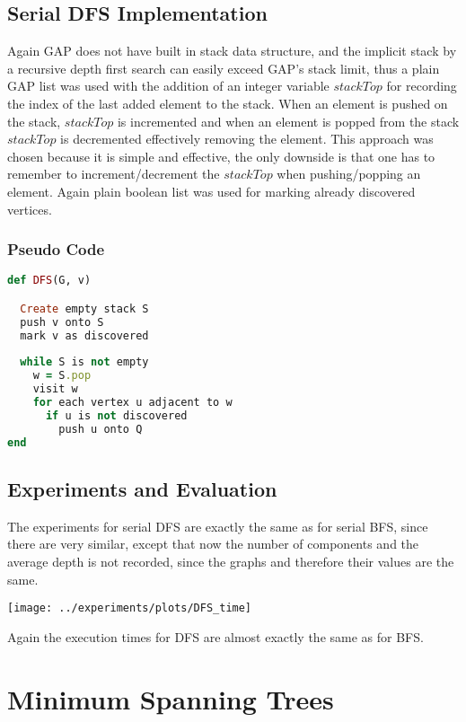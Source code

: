 \documentclass{report}
\theoremstyle{plain}
\theoremstyle{definition}
\theoremstyle{remark}
\begin{document}
\section{Serial DFS Implementation}

Again GAP does not have built in stack data structure, and the implicit stack by a recursive depth first search can easily exceed GAP's stack limit, thus a plain GAP list was used with the addition of an integer variable $stackTop$ for recording the index of the last added element to the stack. When an element is pushed on the stack, $stackTop$ is incremented and when an element is popped from the stack $stackTop$ is decremented effectively removing the element. This approach was chosen because it is simple and effective, the only downside is that one has to remember to increment/decrement the $stackTop$ when pushing/popping an element. Again plain boolean list was used for marking already discovered vertices.

\subsection*{Pseudo Code}

\begin{lstlisting}[language=Ruby]
def DFS(G, v)

  Create empty stack S
  push v onto S
  mark v as discovered
  
  while S is not empty
    w = S.pop
    visit w
    for each vertex u adjacent to w
      if u is not discovered
        push u onto Q
end
\end{lstlisting}

\section{Experiments and Evaluation}

The experiments for serial DFS are exactly the same as for serial BFS, since there are very similar, except that now the number of components and the average depth is not recorded, since the graphs and therefore their values are the same.

\texttt{[image: ../experiments/plots/DFS\_time]}

Again the execution times for DFS are almost exactly the same as for BFS.

\chapter{Minimum Spanning Trees}
\end{document}
